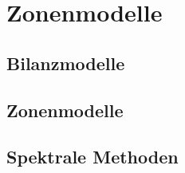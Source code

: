 %
%
%
\chapter{Zonenmodelle}

\section{Bilanzmodelle}

\section{Zonenmodelle}

\section{Spektrale Methoden}

